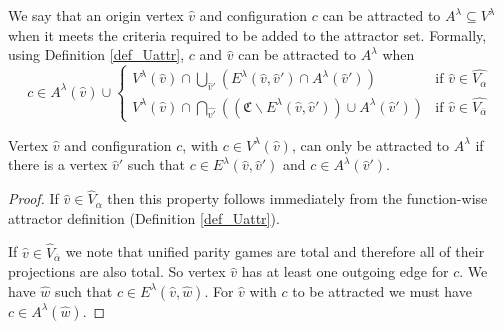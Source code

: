 We say that an origin vertex $\hat{v}$ and configuration $c$ can be attracted to $A^\lambda \subseteq V^\lambda$ when it meets the criteria required to be added to the attractor set. Formally, using Definition \ref{def_Uattr}, $c$ and $\hat{v}$ can be attracted to $A^\lambda$ when 
\[
c \in A^\lambda(\hat{v}) \cup \begin{cases}
V^\lambda(\hat{v}) \cap \bigcup_{\hat{v}'} (E^\lambda(\hat{v},\hat{v}') \cap A^\lambda(\hat{v}')) & \text{if } \hat{v} \in \hat{V_{\alpha}}\\
V^\lambda(\hat{v}) \cap \bigcap_{\hat{v'}}((\mathfrak{C} \backslash E^\lambda(\hat{v},\hat{v}')) \cup A^\lambda(\hat{v}')) & \text{if }\hat{v} \in  \hat{V_{\overline{\alpha}}}\end{cases} 
\]
\begin{lemma}
\label{lem_attr_requires_E}
Vertex $\hat{v}$ and configuration $c$, with $c \in V^\lambda(\hat{v})$, can only be attracted to $A^\lambda$ if there is a vertex $\hat{v}'$ such that $c \in E^\lambda(\hat{v}, \hat{v}')$ and $c \in A^\lambda(\hat{v}')$.
	\begin{proof}
		If $\hat{v} \in \hat{V}_\alpha$ then this property follows immediately from the function-wise attractor definition (Definition \ref{def_Uattr}). 
		
		If $\hat{v} \in \hat{V}_{\overline{\alpha}}$ we note that unified parity games are total and therefore all of their projections are also total. So vertex $\hat{v}$ has at least one outgoing edge for $c$. We have $\hat{w}$ such that $c \in E^\lambda(\hat{v},\hat{w})$. For $\hat{v}$ with $c$ to be attracted we must have $c \in A^\lambda(\hat{w})$.
	\end{proof}
\end{lemma}

